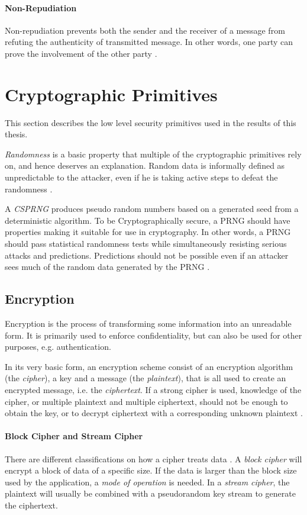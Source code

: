 \documentclass[pdftex,english,10pt,b5paper,twoside]{book}
\begin{document}
\paragraph{Non-Repudiation} Non-repudiation prevents both the sender and the
receiver of a message from refuting the authenticity of transmitted message. In
other words, one party can prove the involvement of the other party
\cite{stallings}.

\section{Cryptographic Primitives}

This section describes the low level security primitives used in the results of
this thesis.

\emph{Randomness} is a basic property that multiple of the cryptographic
primitives rely on, and hence deserves an explanation. Random data is
informally defined as unpredictable to the attacker, even if he is taking
active steps to defeat the randomness \cite[p. 137]{schneier}.

A \emph{\ac{CSPRNG}} produces pseudo random numbers based on a generated seed from a
deterministic algorithm. To be Cryptographically secure, a PRNG should have
properties making it suitable for use in cryptography. In other words, a PRNG should
pass statistical randomness tests while simultaneously resisting serious attacks
and predictions. Predictions should not be possible even if an attacker sees
much of the random data generated by the PRNG \cite[p. 140]{schneier}.

\subsection{Encryption}

Encryption is the process of transforming some information into an unreadable
form. It is primarily used to enforce confidentiality, but can also be
used for other purposes, e.g. authentication.

In its very basic form, an encryption scheme consist of an encryption algorithm
(the \emph{cipher}), a key and a message (the \emph{plaintext}), that is all
used to create an encrypted message, i.e. the \emph{ciphertext}. If a strong
cipher is used, knowledge of the cipher, or multiple plaintext and multiple
ciphertext, should not be enough to obtain the key, or to decrypt ciphertext
with a corresponding unknown plaintext \cite{schneier}.

\paragraph{Block Cipher and Stream Cipher} There are different classifications
on how a cipher treats data \cite[p. 32]{stallings}. A \emph{block cipher} will
encrypt a block of data of a specific size. If the data is larger than the
block size used by the application, a \emph{mode of operation} is needed. In a
\emph{stream cipher}, the plaintext will usually be combined with a pseudorandom key
stream to generate the ciphertext.
\end{document}

